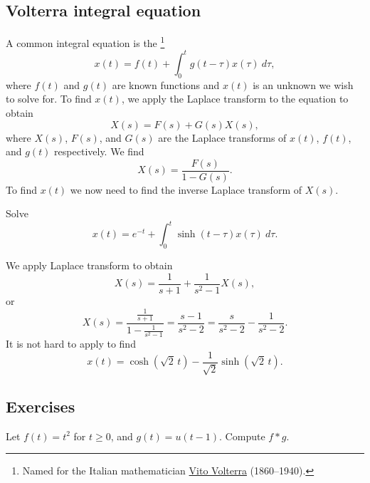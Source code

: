 \documentclass[12pt]{book}
\begin{document}
\subsection{Volterra integral equation}

A common integral equation
is the \emph{}%
\footnote{Named for the Italian mathematician
\href{http://en.wikipedia.org/wiki/Vito_Volterra}{Vito Volterra}
(1860--1940).}
\begin{equation*}
x(t) = f(t) + \int_0^t g(t-\tau) x(\tau) ~ d\tau ,
\end{equation*}
where $f(t)$ and $g(t)$ are known functions and $x(t)$ is an unknown we
wish to solve for.
To find $x(t)$,
we apply the Laplace transform to the equation to obtain 
\begin{equation*}
X(s) = F(s) + G(s) X(s) ,
\end{equation*}
where $X(s)$, $F(s)$, and $G(s)$ are the Laplace transforms of $x(t)$, $f(t)$, and
$g(t)$ respectively.  We find
\begin{equation*}
X(s) = \frac{F(s)}{1-G(s)} .
\end{equation*}
To find $x(t)$ we now need to find the 
inverse Laplace transform of $X(s)$.

\begin{example}
Solve
\begin{equation*}
x(t) =  e^{-t} + \int_0^t \sinh(t-\tau) x(\tau) ~ d\tau .
\end{equation*}

We apply Laplace transform to obtain
\begin{equation*}
X(s) = \frac{1}{s+1} + \frac{1}{s^2-1} X(s) ,
\end{equation*}
or
\begin{equation*}
X(s) = \frac{\frac{1}{s+1}}{1- \frac{1}{s^2-1}}
=
\frac{s-1}{s^2 - 2}
=
\frac{s}{s^2 - 2}
-
\frac{1}{s^2 - 2} .
\end{equation*}
It is not hard to apply  to find
\begin{equation*}
x(t) = \cosh (\! \sqrt{2} \, t) -
\frac{1}{\sqrt{2}} \sinh (\!  \sqrt{2}\, t ).
\end{equation*}
\end{example}

\subsection{Exercises}

\begin{exercise}
Let $f(t) = t^2$ for $t \geq 0$, and $g(t) = u(t-1)$.  Compute
$f * g$.
\end{exercise}
\end{document}
